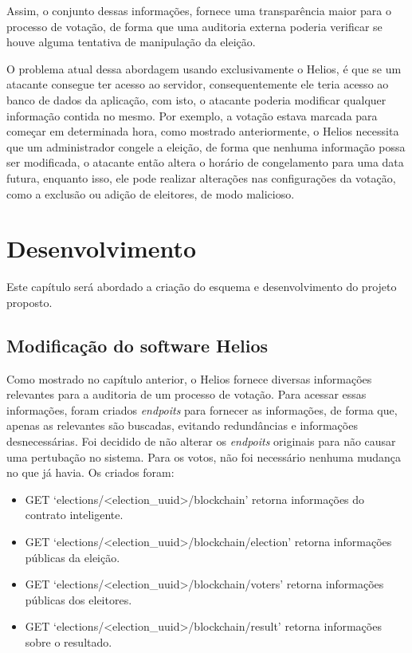 \documentclass{ufsctex/ufsctex}
\begin{document}
\begin{lstlisting}[numbers=none]
\end{lstlisting}

Assim, o conjunto dessas informações, fornece uma transparência maior para o
processo de votação, de forma que uma auditoria externa poderia verificar se
houve alguma tentativa de manipulação da eleição. 

O problema atual dessa abordagem usando exclusivamente o Helios, é que se um
atacante consegue ter acesso ao servidor, consequentemente ele teria acesso ao
banco de dados da aplicação, com isto, o atacante poderia modificar qualquer
informação contida no mesmo. Por exemplo, a votação estava marcada para começar
em determinada hora, como mostrado anteriormente, o Helios necessita que um
administrador congele a eleição, de forma que nenhuma informação possa ser
modificada, o atacante então altera o horário de congelamento para uma data
futura, enquanto isso, ele pode realizar alterações nas configurações da
votação, como a exclusão ou adição de eleitores, de modo malicioso.


\chapter{Desenvolvimento}

Este capítulo será abordado a criação do esquema e desenvolvimento do projeto
proposto.

\section{Modificação do software Helios} 

Como mostrado no capítulo anterior, o Helios fornece diversas informações
relevantes para a auditoria de um processo de votação. Para acessar essas
informações, foram criados \textit{endpoits} para fornecer as informações, de
forma que, apenas as relevantes são buscadas, evitando redundâncias e
informações desnecessárias. Foi decidido de não alterar os \textit{endpoits}
originais para não causar uma pertubação no sistema. Para os votos, não foi
necessário nenhuma mudança no que já havia. Os criados foram:

\begin{itemize}
	\item GET `elections/<election\_uuid>/blockchain' retorna 
		informações do contrato inteligente.
	\item GET `elections/<election\_uuid>/blockchain/election' retorna 
		informações públicas da eleição.
	\item GET `elections/<election\_uuid>/blockchain/voters' retorna 
		informações públicas dos eleitores.
	\item GET `elections/<election\_uuid>/blockchain/result' retorna
		informações sobre o resultado.
\end{itemize}
\end{document}
